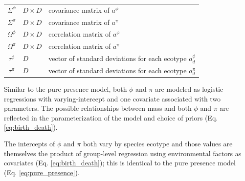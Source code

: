 \documentclass[12pt,letterpaper]{article}
\begin{document}
\begin{table}
\begin{tabular}{c l l}
    \(\Sigma^{\phi}\) & \(D \times D\) & covariance matrix of \(a^{\phi}\) \\
    \(\Sigma^{\pi}\) & \(D \times D\) & covariance matrix of \(a^{\pi}\) \\
    \(\Omega^{\phi}\) & \(D \times D\) & correlation matrix of \(a^{\phi}\) \\
    \(\Omega^{\pi}\) & \(D \times D\) & correlation matrix of \(a^{\pi}\) \\
    \(\tau^{\phi}\) & \(D\) & vector of standard deviations for each ecotype \(a^{\phi}_{d}\) \\
    \(\tau^{\pi}\) & \(D\) & vector of standard deviations for each ecotype \(a^{\pi}_{d}\) \\
  \end{tabular}
  \label{tab:bd_param}
\end{table}

Similar to the pure-presence model, both \(\phi\) and \(\pi\) are modeled as logistic regressions with varying-intercept and one covariate associated with two parameters. The possible relationships between mass and both \(\phi\) and \(\pi\) are reflected in the parameterization of the model and choice of priors (Eq. \ref{eq:birth_death}).

The intercepts of \(\phi\) and \(\pi\) both vary by species ecotype and those values are themselves the product of group-level regression using environmental factors as covariates (Eq. \ref{eq:birth_death}); this is identical to the pure presence model (Eq. \ref{eq:pure_presence}).
\end{document}
